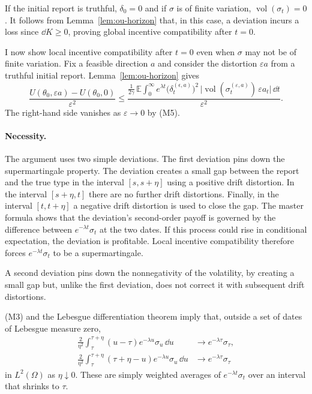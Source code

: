 \documentclass[12pt]{article}
\DeclareMathOperator{\vol}{vol}
\newcommand{\E}{\mathbb{E}}
\begin{document}
If the initial report is truthful, $\delta_0=0$ and if $\sigma$ is of finite variation, $\vol(\sigma_t)=0$. It follows from Lemma~\ref{lem:ou-horizon} that, in this case, a deviation incurs a loss since $\dd{K}\geq 0$, proving global incentive compatibility after $t=0$. 

I now show local incentive compatibility after $t=0$ even when $\sigma$ may not be of finite variation. Fix a feasible direction \(a\) and consider the distortion
\(\varepsilon a\) from a truthful initial report. 
Lemma~\ref{lem:ou-horizon} gives
\[
\frac{U(\theta_0,\varepsilon a)-U(\theta_0,0)}{\varepsilon^2}
\le
\frac{\frac{1}{2\gamma}\,
\E\!\int_0^\infty e^{\lambda t}
  \big(\delta_t^{(\epsilon, a)}\big)^{2}\,
\big|\vol(\sigma_t^{(\varepsilon,a)})\,\varepsilon a_t\big|\,\dd t}{\varepsilon^2}.
\]
 The right-hand side vanishes as $\varepsilon \rightarrow 0$ by (M5).


\paragraph{Necessity.}
The argument uses two simple deviations. The first deviation pins down the supermartingale property. The deviation creates a small gap between the report and the true type in the interval $[s,s+\eta]$ using a positive drift distortion. In the interval $[s+\eta, t]$ there are no further drift distortions. Finally, in the interval $[t, t+ \eta]$ a negative drift distortion is used to close the gap. The
master formula shows that the deviation's second-order payoff is governed
by the difference between \(e^{-\lambda t}\sigma_t\) at the two dates.
If this process could rise in conditional expectation, the deviation is profitable. Local incentive compatibility therefore forces  \(e^{-\lambda t}\sigma_t\) to be a
supermartingale. 


A second deviation pins down the nonnegativity of the volatility, by creating a small gap but, unlike the first deviation, does not correct it with subsequent drift distortions. 

\textnormal{(M3)} and the Lebesgue differentiation
theorem imply that, outside a set of dates of Lebesgue measure
zero,
\begin{align}
  \frac{2}{\eta^2}\int_\tau^{\tau+\eta}
    (u-\tau)e^{-\lambda u}\sigma_u\,\dd u
  &\longrightarrow e^{-\lambda\tau}\sigma_\tau,
  \label{eq:ou-forward-average}\\
  \frac{2}{\eta^2}\int_\tau^{\tau+\eta}
    (\tau+\eta-u)e^{-\lambda u}\sigma_u\,\dd u
  &\longrightarrow e^{-\lambda\tau}\sigma_\tau
  \label{eq:ou-backward-average}
\end{align}
in \(L^2(\Omega)\) as \(\eta\downarrow0\). These are simply weighted
averages of $e^{-\lambda t}\sigma_t$ over an interval that shrinks to \(\tau\).
\end{document}
